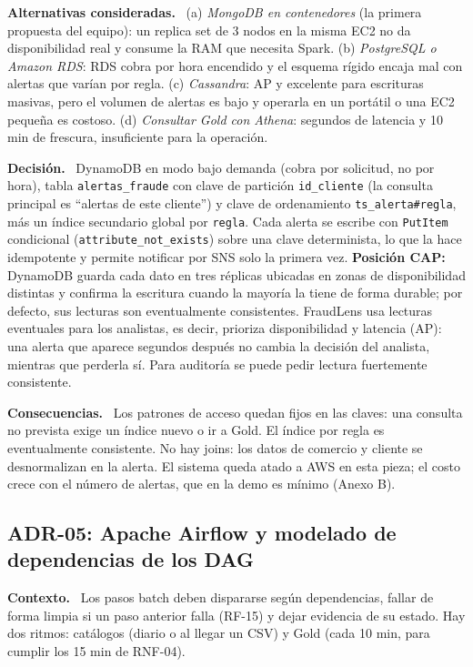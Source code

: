 \documentclass[12pt,letterpaper]{article}
\newcommand{\code}[1]{{\small\texttt{#1}}}
\newcommand{\adrpart}[1]{\textbf{#1.}~}
\begin{document}
\adrpart{Alternativas consideradas} (a) \emph{MongoDB en contenedores} (la primera propuesta del equipo): un replica set de 3 nodos en la misma EC2 no da disponibilidad real y consume la RAM que necesita Spark. (b) \emph{PostgreSQL o Amazon RDS}: RDS cobra por hora encendido y el esquema rígido encaja mal con alertas que varían por regla. (c) \emph{Cassandra}: AP y excelente para escrituras masivas, pero el volumen de alertas es bajo y operarla en un portátil o una EC2 pequeña es costoso. (d) \emph{Consultar Gold con Athena}: segundos de latencia y 10 min de frescura, insuficiente para la operación.

\adrpart{Decisión} DynamoDB en modo bajo demanda (cobra por solicitud, no por hora), tabla \code{alertas\_fraude} con clave de partición \code{id\_cliente} (la consulta principal es ``alertas de este cliente'') y clave de ordenamiento \code{ts\_alerta\#regla}, más un índice secundario global por \code{regla}. Cada alerta se escribe con \code{PutItem} condicional (\code{attribute\_not\_exists}) sobre una clave determinista, lo que la hace idempotente y permite notificar por SNS solo la primera vez. \textbf{Posición CAP:} DynamoDB guarda cada dato en tres réplicas ubicadas en zonas de disponibilidad distintas y confirma la escritura cuando la mayoría la tiene de forma durable; por defecto, sus lecturas son eventualmente consistentes. FraudLens usa lecturas eventuales para los analistas, es decir, prioriza disponibilidad y latencia (AP): una alerta que aparece segundos después no cambia la decisión del analista, mientras que perderla sí. Para auditoría se puede pedir lectura fuertemente consistente.

\adrpart{Consecuencias} Los patrones de acceso quedan fijos en las claves: una consulta no prevista exige un índice nuevo o ir a Gold. El índice por regla es eventualmente consistente. No hay joins: los datos de comercio y cliente se desnormalizan en la alerta. El sistema queda atado a AWS en esta pieza; el costo crece con el número de alertas, que en la demo es mínimo (Anexo B).

\subsection*{ADR-05: Apache Airflow y modelado de dependencias de los DAG}

\adrpart{Contexto} Los pasos batch deben dispararse según dependencias, fallar de forma limpia si un paso anterior falla (RF-15) y dejar evidencia de su estado. Hay dos ritmos: catálogos (diario o al llegar un CSV) y Gold (cada 10 min, para cumplir los 15 min de RNF-04).
\end{document}
